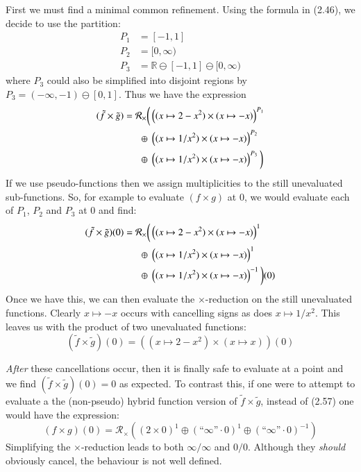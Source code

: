 First we must find a minimal common refinement.
Using the formula in (2.46), we decide to use the partition:
\begin{align}
	P_1 &= [-1,1] \\
	P_2 &= [0, \infty) \\
	P_3 &= \mathbb{R} \ominus [-1,1] \ominus [0, \infty)
\end{align}
where $P_3$ could also be simplified into disjoint regions by $P_3 = (-\infty, -1) \ominus [0,1]$.
Thus we have the expression
\begin{align}
	(\tilde{f} \times \tilde{g}) = \mathcal{R}_\times \bigg(
				& \left( (x \mapsto 2-x^2) \times (x \mapsto -x) \right)^{P_1} \notag \\
		\oplus \;& \left( (x \mapsto 1/x^2) \times (x \mapsto -x) \right)^{P_2} \notag \\
		\oplus \;& \left( (x \mapsto 1/x^2) \times (x \mapsto -x) \right)^{P_3} 
	\bigg)
\end{align}
If we use pseudo-functions then we assign multiplicities to the still unevaluated sub-functions.
So, for example to evaluate $(f \times g)$ at 0, we would evaluate each of $P_1$, $P_2$ and $P_3$ at 0 and find:
\begin{align}
	(\tilde{f} \times \tilde{g})(0) = \mathcal{R}_\times \bigg(
				& \left( (x \mapsto 2-x^2) \times (x \mapsto -x) \right)^1 \notag \\
		\oplus \;& \left( (x \mapsto 1/x^2) \times (x \mapsto -x) \right)^1 \notag \\
		\oplus \;& \left( (x \mapsto 1/x^2) \times (x \mapsto -x) \right)^{-1} 
	\bigg)(0)
\end{align}
Once we have this, we can then evaluate the $\times$-reduction on the still unevaluated functions.
Clearly $x \mapsto -x$ occurs with cancelling signs as does $x \mapsto 1/x^2$.
This leaves us with the product of two unevaluated functions:
\begin{equation}
	(\tilde{f} \times \tilde{g})(0) = \left((x \mapsto 2-x^2) \times (x \mapsto x)\right) (0)
\end{equation}


\emph{After} these cancellations occur, then it is finally safe to evaluate at a point and 
we find $(\tilde{f} \times \tilde{g})(0)=0$ as expected.
To contrast this, if one were to attempt to evaluate a the (non-pseudo) hybrid function version of 
$\tilde{f} \times \tilde{g}$, instead of (2.57) one would have the expression:
\begin{equation}
	(f \times g)(0) = \mathcal{R}_\times \left( (2 \times 0)^1 \oplus (\text{``}\infty\text{''} \cdot 0)^1 \oplus (\text{``}\infty\text{''} \cdot 0)^{-1} \right)
\end{equation}
Simplifying the $\times$-reduction leads to both $\infty / \infty$ and $0/0$.
Although they \emph{should} obviously cancel, the behaviour is not well defined.
